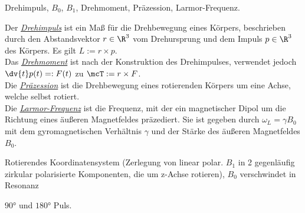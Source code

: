 \documentclass{subfiles}
\begin{document}
    \begin{Frage}
        Drehimpuls, $B_0$, $B_1$, Drehmoment, Präzession, Larmor-Frequenz.
    \end{Frage}
    \begin{Antwort}
        Der \href{https://de.wikipedia.org/wiki/Drehimpuls}{\emph{Drehimpuls}} ist ein Maß für die Drehbewegung eines Körpers, beschrieben durch den Abstandsvektor $r\in\R^3$ vom Drehursprung und dem Impuls $p\in\R^3$ des Körpers. Es gilt $L := r\times p$.\\

        Das \href{https://de.wikipedia.org/wiki/Drehmoment}{\emph{Drehmoment}} ist nach der Konstruktion des Drehimpulses, verwendet jedoch $\dv{t}p(t) =: F(t)$ zu $\mcT := r\times F$. \\

        Die \href{https://de.wikipedia.org/w/index.php?title=Präzession&oldid=235094402}{\emph{Präzession}} ist die Drehbewegung eines rotierenden Körpers um eine Achse, welche selbst rotiert. \\

        Die \href{https://de.wikipedia.org/wiki/Larmorpräzession}{\emph{Larmor-Frequenz}} ist die Frequenz, mit der ein magnetischer Dipol um die Richtung eines äußeren Magnetfeldes präzediert. Sie ist gegeben durch $\omega_L = \gamma B_0$ mit dem gyromagnetischen Verhältnis $\gamma$ und der Stärke des äußeren Magnetfeldes $B_0$.\\
    \end{Antwort}


    \begin{Frage}
        Rotierendes Koordinatensystem (Zerlegung von linear polar. $B_1$ in 2 gegenläufig zirkular polarisierte Komponenten, die um z-Achse rotieren), $B_0$ verschwindet in Resonanz
    \end{Frage}
    \begin{Antwort}
        
    \end{Antwort}


    \begin{Frage}
        $90\si\degree$ und $180\si\degree$ Puls. 
    \end{Frage}
    \begin{Antwort}
        
    \end{Antwort}
\end{document}
